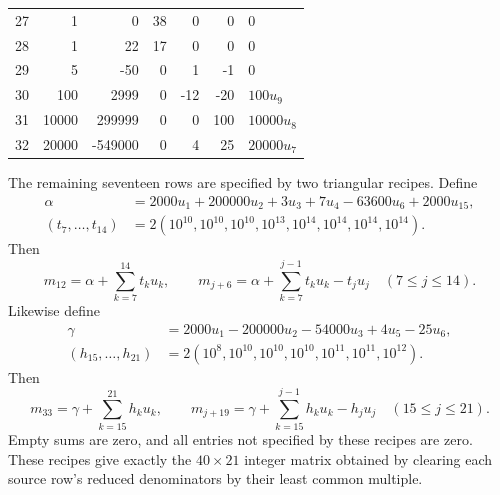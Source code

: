 \documentclass[11pt]{article}
\theoremstyle{remark}
\begin{document}
\begin{appendices}
\begin{center}
\begin{tabular}{r|rrrrr|l}
27&1&0&38&0&0&$0$\\
28&1&22&17&0&0&$0$\\
29&5&-50&0&1&-1&$0$\\
30&100&2999&0&-12&-20&$100u_{9}$\\
31&10000&299999&0&0&100&$10000u_{8}$\\
32&20000&-549000&0&4&25&$20000u_{7}$\\
\end{tabular}
\end{center}
The remaining seventeen rows are specified by two triangular recipes. Define
\[
 \begin{aligned}
 \alpha&=2000u_1+200000u_2+3u_3+7u_4-63600u_6+2000u_{15},\\
 (t_7,\ldots,t_{14})&=2(10^{10},10^{10},10^{10},10^{13},10^{14},10^{14},10^{14},10^{14}).
 \end{aligned}
\]
Then
\[
 m_{12}=\alpha+\sum_{k=7}^{14}t_ku_k,\qquad
 m_{j+6}=\alpha+\sum_{k=7}^{j-1}t_ku_k-t_ju_j\quad(7\le j\le14).
\]
Likewise define
\[
 \begin{aligned}
 \gamma&=2000u_1-200000u_2-54000u_3+4u_5-25u_6,\\
 (h_{15},\ldots,h_{21})&=2(10^8,10^{10},10^{10},10^{10},10^{11},10^{11},10^{12}).
 \end{aligned}
\]
Then
\[
 m_{33}=\gamma+\sum_{k=15}^{21}h_ku_k,\qquad
 m_{j+19}=\gamma+\sum_{k=15}^{j-1}h_ku_k-h_ju_j\quad(15\le j\le21).
\]
Empty sums are zero, and all entries not specified by these recipes are zero.
These recipes give exactly the $40\times21$ integer matrix obtained by clearing
each source row's reduced denominators by their least common multiple.

\end{appendices}
\end{document}
